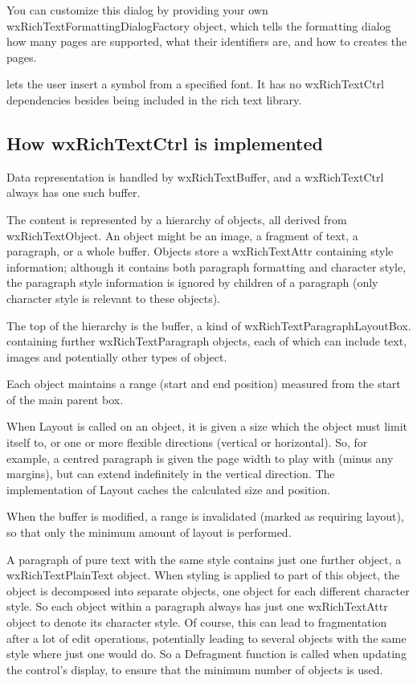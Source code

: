 You can customize this dialog by providing your own wxRichTextFormattingDialogFactory
object, which tells the formatting dialog how many pages are supported, what their identifiers
are, and how to creates the pages.

 lets the user insert a symbol from
a specified font. It has no wxRichTextCtrl dependencies besides being included in
the rich text library.

\subsection{How wxRichTextCtrl is implemented}

Data representation is handled by wxRichTextBuffer, and a wxRichTextCtrl
always has one such buffer.

The content is represented by a hierarchy of objects, all derived from
wxRichTextObject. An object might be an image, a fragment of text, a paragraph,
or a whole buffer. Objects store a wxRichTextAttr containing style information;
although it contains both paragraph formatting and character style, the
paragraph style information is ignored by children of a paragraph (only
character style is relevant to these objects).

The top of the hierarchy is the buffer, a kind of wxRichTextParagraphLayoutBox.
containing further wxRichTextParagraph objects, each of which can include text,
images and potentially other types of object.

Each object maintains a range (start and end position) measured
from the start of the main parent box.

When Layout is called on an object, it is given a size which the object
must limit itself to, or one or more flexible directions (vertical
or horizontal). So, for example, a centred paragraph is given the page
width to play with (minus any margins), but can extend indefinitely
in the vertical direction. The implementation of Layout caches the calculated
size and position.

When the buffer is modified, a range is invalidated (marked as requiring
layout), so that only the minimum amount of layout is performed.

A paragraph of pure text with the same style contains just one further
object, a wxRichTextPlainText object. When styling is applied to part of
this object, the object is decomposed into separate objects, one object
for each different character style. So each object within a paragraph always has
just one wxRichTextAttr object to denote its character style. Of course, this can
lead to fragmentation after a lot of edit operations, potentially leading
to several objects with the same style where just one would do. So
a Defragment function is called when updating the control's display, to ensure that
the minimum number of objects is used.

